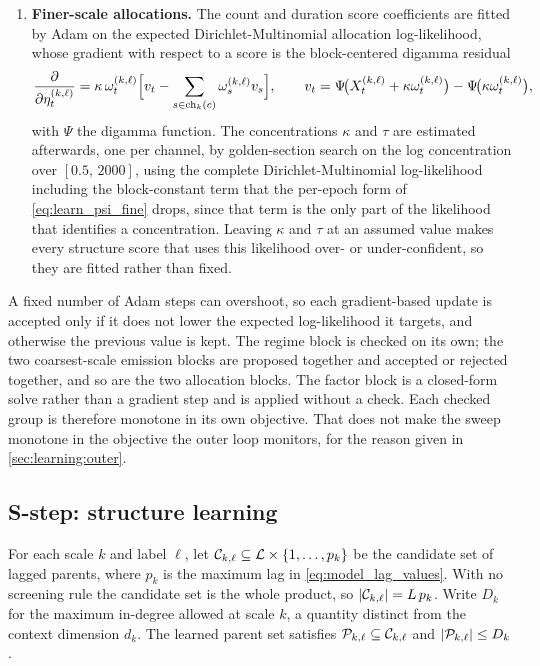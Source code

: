 \begin{enumerate}
\item \textbf{Finer-scale allocations.} The count and duration score coefficients are fitted by
Adam on the expected Dirichlet-Multinomial allocation log-likelihood, whose gradient with respect
to a score is the block-centered digamma residual
\[
\frac{\partial}{\partial \eta_t^{(k,\ell)}}
=
\kappa\, \omega_t^{(k,\ell)} \Big[ v_t - \sum_{s \in \operatorname{ch}_k(c)} \omega_s^{(k,\ell)} v_s \Big],
\qquad
v_t = \Psi\!\big(X_t^{(k,\ell)} + \kappa \omega_t^{(k,\ell)}\big) - \Psi\!\big(\kappa \omega_t^{(k,\ell)}\big),
\]
with $\Psi$ the digamma function. The concentrations $\kappa$ and $\tau$ are estimated afterwards,
one per channel, by golden-section search on the log concentration over $[0.5,\,2000]$, using the
complete Dirichlet-Multinomial
log-likelihood including the block-constant term that the per-epoch form of
\cref{eq:learn_psi_fine} drops, since that term is the only part of the likelihood that
identifies a concentration. Leaving $\kappa$ and $\tau$ at an assumed value makes every structure
score that uses this likelihood over- or under-confident, so they are fitted rather than fixed.
\end{enumerate}

A fixed number of Adam steps can overshoot, so each gradient-based update is accepted only if it
does not lower the expected log-likelihood it targets, and otherwise the previous value is kept.
The regime block is checked on its own; the two coarsest-scale emission blocks are proposed
together and accepted or rejected together, and so are the two allocation blocks. The factor block
is a closed-form solve rather than a gradient step and is applied without a check. Each checked
group is therefore monotone in its own objective. That does not make the sweep monotone in the
objective the outer loop monitors, for the reason given in \cref{sec:learning:outer}.

\subsection{S-step: structure learning}
\label{sec:learning:sstep}

For each scale $k$ and label $\ell$, let
${\mathcal{C}}_{k,\ell} \subseteq {\mathcal{L}} \times \{1,\dots,p_k\}$ be the candidate set of lagged parents, where
$p_k$ is the maximum lag in \cref{eq:model_lag_values}. With no screening rule the candidate
set is the whole product, so $|{\mathcal{C}}_{k,\ell}| = L\,p_k$. Write $D_k$ for the maximum in-degree
allowed at scale $k$, a quantity distinct from the context dimension $d_k$. The learned parent set
satisfies ${\mathcal{P}}_{k,\ell} \subseteq {\mathcal{C}}_{k,\ell}$ and $|{\mathcal{P}}_{k,\ell}| \le D_k$.

